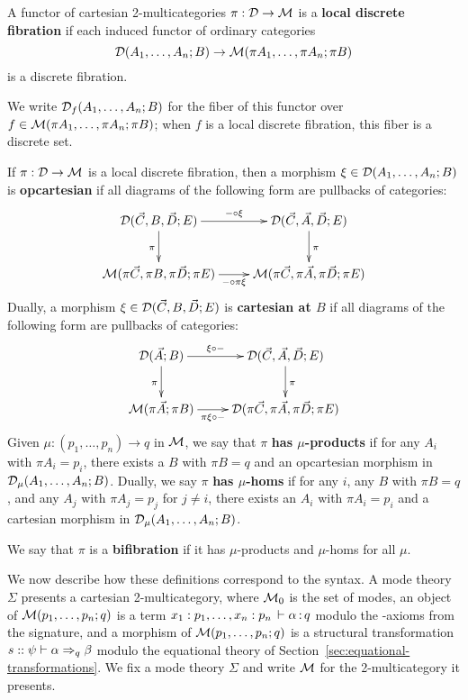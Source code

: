 \begin{definition}
  A functor of cartesian 2-multicategories $\pi:\mathcal{D}\to\mathcal{M}$ is a \textbf{local discrete fibration} if each induced functor of ordinary categories
  \[\mathcal{D}(A_1,\dots,A_n;B)\to\mathcal{M}(\pi A_1,\dots,\pi A_n;\pi B)\]
  is a discrete fibration.
\end{definition}

We write $\mathcal{D}_f(A_1,\dots,A_n;B)$ for the fiber of this functor over
$f\in \mathcal{M}(\pi A_1,\dots,\pi A_n;\pi B)$; when $f$ is a local discrete
fibration, this fiber is a discrete set.

\begin{definition}
  If $\pi:\mathcal{D}\to\mathcal{M}$ is a local discrete fibration, then a morphism $\xi\in\mathcal{D}(A_1,\dots,A_n;B)$ is \textbf{opcartesian} if all diagrams of the following form are pullbacks of categories:
  \[ \xymatrix{
    \cD(\vec C,B,\vec D;E) \ar[r]^-{-\circ \xi} \ar[d]_\pi &
    \cD(\vec C,\vec A,\vec D;E) \ar[d]^\pi \\
    \M(\pi\vec C,\pi B, \pi\vec D; \pi E) \ar[r]_-{-\circ \pi\xi} &
    \M(\pi\vec C,\pi\vec A,\pi\vec D;\pi E)
  }\]
  Dually, a morphism $\xi\in\mathcal{D}(\vec C,B,\vec D;E)$ is \textbf{cartesian at $B$} if all diagrams of the following form are pullbacks of categories:
  \[ \xymatrix{
    \cD(\vec A;B) \ar[r]^-{\xi\circ -} \ar[d]_\pi &
    \cD(\vec C,\vec A,\vec D;E) \ar[d]^\pi \\
    \M(\pi\vec A;\pi B) \ar[r]_-{\pi\xi\circ -} &
    \cD(\pi\vec C,\pi\vec A,\pi\vec D;\pi E)
  }\]
  Given $\mu:(p_1,\dots,p_n) \to q$ in $\mathcal{M}$, we say that $\pi$ \textbf{has $\mu$-products} if for any $A_i$ with $\pi A_i = p_i$, there exists a $B$ with $\pi B = q$ and an opcartesian morphism in $\mathcal{D}_\mu(A_1,\dots,A_n;B)$.
  Dually, we say $\pi$ \textbf{has $\mu$-homs} if for any $i$, any $B$ with $\pi B = q$, and any $A_j$ with $\pi A_j = p_j$ for $j\neq i$, there exists an $A_i$ with $\pi A_i = p_i$ and a cartesian morphism in $\mathcal{D}_\mu(A_1,\dots,A_n;B)$.

  We say that $\pi$ is a \textbf{bifibration} if it has $\mu$-products
  and $\mu$-homs for all $\mu$.
\end{definition}

We now describe how these definitions correspond to the syntax.  A mode
theory $\Sigma$ presents a cartesian 2-multicategory, where $\mathcal{M}_0$ is
the set of modes, an object of $\mathcal{M}(p_1,\ldots,p_n;q)$ is a term
$x_1:p_1,\ldots,x_n:p_n \, \vdash \alpha \, \mathit{:} \, q$ modulo the \deq-axioms from
the signature, and a morphism of $\mathcal{M}(p_1,\ldots,p_n;q)$ is a structural
transformation $s :: \psi \vdash \alpha \Rightarrow_{q} \beta$ modulo the
equational theory of Section~\ref{sec:equational-transformations}.  We
fix a mode theory $\Sigma$ and write $\mathcal{M}$ for the 2-multicategory it
presents.

